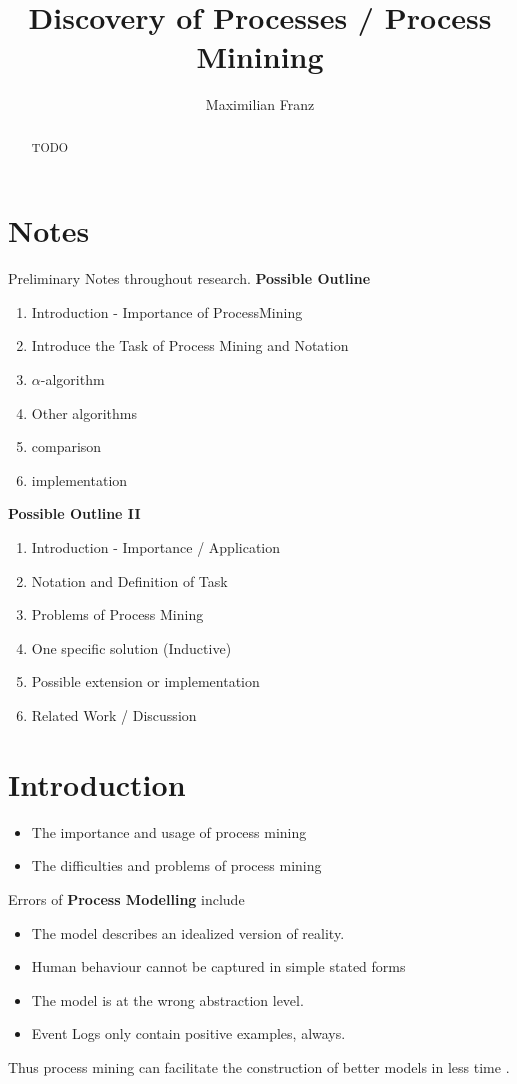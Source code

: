 \documentclass[a4paper]{IEEEtran}
\title{Discovery of Processes / Process Minining}
\author{Maximilian Franz}
\begin{document}
\maketitle

\begin{abstract}
TODO
\end{abstract}

\section{Notes}
Preliminary Notes throughout research. \newline
\textbf{Possible Outline}
\begin{enumerate}
\item Introduction - Importance of ProcessMining
    \item Introduce the Task of Process Mining and Notation
    \item $\alpha$-algorithm
    \item Other algorithms
    \item comparison 
    \item implementation 
\end{enumerate}
\textbf{Possible Outline II}
\begin{enumerate}
    \item Introduction - Importance / Application
    \item Notation and Definition of Task 
    \item Problems of Process Mining
    \item One specific solution (Inductive) 
    \item Possible extension or implementation
    \item Related Work / Discussion 
\end{enumerate}

\section{Introduction}
\begin{itemize}
    \item The importance and usage of process mining 
    \item The difficulties and problems of process mining
\end{itemize}
Errors of \textbf{Process Modelling} include
\begin{itemize}
    \item The model describes an idealized version of reality.
    \item Human behaviour cannot be captured in simple stated forms
    \item The model is at the wrong abstraction level. 
    \item Event Logs only contain positive examples, always.
    
\end{itemize}
Thus process mining can facilitate the construction of better models in less time \cite{process_mining}. \newline
\end{document}
